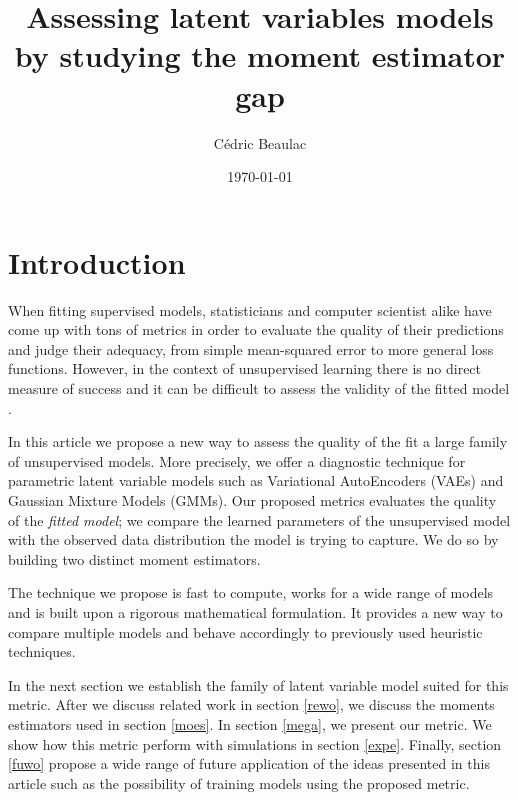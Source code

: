 \documentclass{article}
\begin{document}
\title{Assessing latent variables models by studying the moment estimator gap}



\author{C\'edric Beaulac}


\date{\today}

\maketitle


\section{Introduction} \label{intr}

When fitting supervised models, statisticians and computer scientist alike have come up with tons of metrics in order to evaluate the quality of their predictions and judge their adequacy, from simple mean-squared error to more general loss functions. However, in the context of unsupervised learning there is no direct measure of success and it can be difficult to assess the validity of the fitted model \cite{Hastie09}.

\bigskip

In this article we propose a new way to assess the quality of the fit a large family of unsupervised models. More precisely, we offer a diagnostic technique for parametric latent variable models such as Variational AutoEncoders (VAEs) \cite{Kingma13,Kingma17} and Gaussian Mixture Models (GMMs). Our proposed metrics evaluates the quality of the \textit{fitted model}; we compare the learned parameters of the unsupervised model with the observed data distribution the model is trying to capture. We do so by building two distinct moment estimators. 

\bigskip

The technique we propose is fast to compute, works for a wide range of models and is built upon a rigorous mathematical formulation. It provides a new way to compare multiple models and behave accordingly to previously used heuristic techniques.

\bigskip

In the next section we establish the family of latent variable model suited for this metric. After we discuss related work in section \ref{rewo}, we discuss the moments estimators used in section \ref{moes}.  In section \ref{mega}, we present our metric. We show how this metric perform with simulations in section \ref{expe}. Finally, section \ref{fuwo} propose a wide range of future application of the ideas presented in this article such as the possibility of training models using the proposed metric. 
\end{document}
